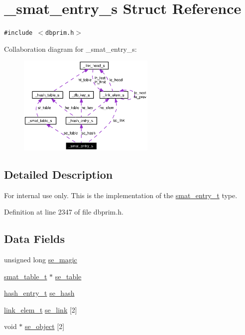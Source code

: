 \hypertarget{struct__smat__entry__s}{
\section{\_\-smat\_\-entry\_\-s Struct Reference}
\label{struct__smat__entry__s}
}
{\tt \#include $<$dbprim.h$>$}

Collaboration diagram for \_\-smat\_\-entry\_\-s:\begin{figure}[H]
\begin{center}
\leavevmode
\includegraphics[width=186pt]{struct__smat__entry__s__coll__graph}
\end{center}
\end{figure}


\subsection{Detailed Description}
\begin{Desc}
\item[For internal use only.]
This is the implementation of the \hyperlink{group__dbprim__smat_ga2}{smat\_\-entry\_\-t} type.\end{Desc}




Definition at line 2347 of file dbprim.h.\subsection*{Data Fields}
\begin{CompactItemize}
\item 
unsigned long \hyperlink{struct__smat__entry__s_o0}{se\_\-magic}
\item 
\hyperlink{struct__smat__table__s}{smat\_\-table\_\-t} $\ast$ \hyperlink{struct__smat__entry__s_o1}{se\_\-table}
\item 
\hyperlink{struct__hash__entry__s}{hash\_\-entry\_\-t} \hyperlink{struct__smat__entry__s_o2}{se\_\-hash}
\item 
\hyperlink{struct__link__elem__s}{link\_\-elem\_\-t} \hyperlink{struct__smat__entry__s_o3}{se\_\-link} \mbox{[}2\mbox{]}
\item 
void $\ast$ \hyperlink{struct__smat__entry__s_o4}{se\_\-object} \mbox{[}2\mbox{]}
\end{CompactItemize}


